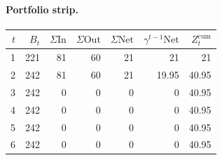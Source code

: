 \documentclass[12pt, a4paper]{article}
\begin{document}
\paragraph{Portfolio strip.}
\begin{center}
\begin{tabular}{rrrrrrr}
\toprule
$t$ & $B_t$ & $\Sigma\mathrm{In}$ & $\Sigma\mathrm{Out}$ & $\Sigma\mathrm{Net}$ & $\gamma^{t-1}\mathrm{Net}$ & $Z_t^{\mathrm{cum}}$\\
\midrule
1 & 221 & 81 & 60 & 21 & 21 & 21 \\
2 & 242 & 81 & 60 & 21 & 19.95 & 40.95 \\
3 & 242 & 0 & 0 & 0 & 0 & 40.95 \\
4 & 242 & 0 & 0 & 0 & 0 & 40.95 \\
5 & 242 & 0 & 0 & 0 & 0 & 40.95 \\
6 & 242 & 0 & 0 & 0 & 0 & 40.95 \\
\bottomrule
\end{tabular}
\end{center}
\end{document}
